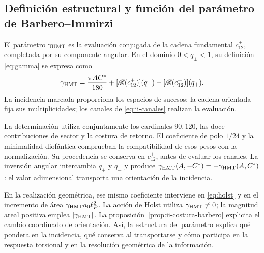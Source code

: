 \subsection{Definición estructural y función del parámetro de Barbero--Immirzi}
\label{sec:ii-definicion-barbero}

\begin{definition}
El parámetro \(\gamma_{\mathrm{HMT}}\) es la evaluación conjugada de la
cadena fundamental \(c_{12}^{+}\), completada por su componente
angular. En el dominio \(0<q_\pm<1\), su definición
\eqref{eq:gamma} se expresa como
\begin{equation}
 \gamma_{\mathrm{HMT}}
 =\frac{\pi AC^*}{180}
  +[\mathscr R(c_{12}^{+})](q_-)
  -[\mathscr R(c_{12}^{+})](q_+).
 \label{eq:ii-definicion-barbero-evaluacion}
\end{equation}
La incidencia marcada proporciona los espacios de sucesos; la cadena
orientada fija sus multiplicidades; los canales de
\eqref{eq:ii-canales} realizan la evaluación.
\end{definition}

La determinación utiliza conjuntamente los cardinales \(90,120\),
las doce contribuciones de sector y la costura de retorno. El
coeficiente de polo \(1/24\) y la minimalidad diofántica comprueban
la compatibilidad de esos pesos con la normalización. Su procedencia
se conserva en \(c_{12}^{+}\), antes de evaluar los canales. La
inversión angular intercambia \(q_+\) y \(q_-\) y produce
\(\gamma_{\mathrm{HMT}}(A,-C^*)=-\gamma_{\mathrm{HMT}}(A,C^*)\): el valor
adimensional transporta una orientación de la incidencia.

En la realización geométrica, ese mismo coeficiente interviene en
\eqref{eq:holst} y en el incremento de área
\(\gamma_{\mathrm{HMT}}a_0\ell_P^2\). La acción de Holst utiliza
\(\gamma_{\mathrm{HMT}}\ne0\); la magnitud areal positiva emplea
\(|\gamma_{\mathrm{HMT}}|\). La proposición~\ref{prop:ii-costura-barbero}
explicita el cambio coordinado de orientación. Así, la estructura
del parámetro explica qué pondera en la incidencia, qué conserva
al transportarse y cómo participa en la respuesta torsional y en
la resolución geométrica de la información.
